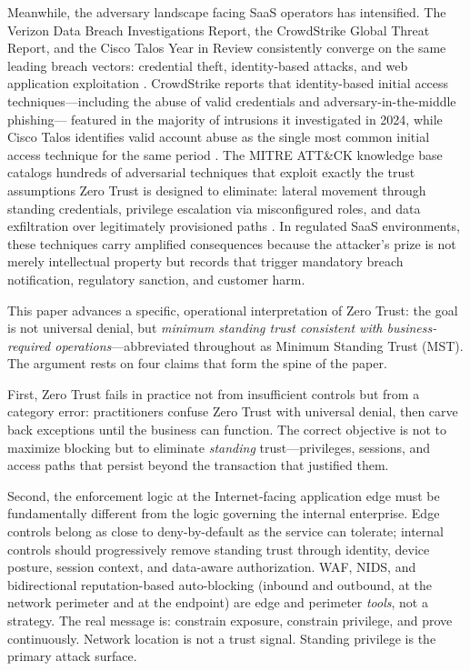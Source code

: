 \documentclass[unnumsec,webpdf,contemporary,large]{oup-authoring-template}
\theoremstyle{thmstyleone}
\theoremstyle{thmstyletwo}
\theoremstyle{thmstylethree}
\begin{document}
Meanwhile, the adversary landscape facing SaaS operators has intensified. The Verizon Data
Breach Investigations Report, the CrowdStrike Global Threat Report, and the Cisco Talos
Year in Review consistently converge on the same leading breach vectors: credential theft,
identity-based attacks, and web application exploitation \cite{verizon2025, crowdstrike2025, ciscotalos2025}. CrowdStrike reports that identity-based initial access
techniques---including the abuse of valid credentials and adversary-in-the-middle phishing---
featured in the majority of intrusions it investigated in 2024, while Cisco Talos identifies
valid account abuse as the single most common initial access technique for the same
period \cite{crowdstrike2025, ciscotalos2025}. The MITRE ATT\&CK knowledge base
catalogs hundreds of adversarial techniques that exploit exactly the trust assumptions Zero
Trust is designed to eliminate: lateral movement through standing credentials,
privilege escalation via misconfigured roles, and data exfiltration over legitimately
provisioned paths \cite{strom2018}. In regulated SaaS environments, these techniques
carry amplified consequences because the attacker's prize is not merely intellectual property
but records that trigger mandatory breach notification, regulatory sanction, and customer
harm.

This paper advances a specific, operational interpretation of Zero Trust: the goal is
not universal denial, but \textit{minimum standing trust consistent with
business-required operations}---abbreviated throughout as Minimum Standing Trust (MST).
The argument rests on four claims that form the spine of the paper.

First, Zero Trust fails in practice not from insufficient controls but from a
category error: practitioners confuse Zero Trust with universal denial, then carve
back exceptions until the business can function. The correct objective is not to
maximize blocking but to eliminate \textit{standing} trust---privileges, sessions,
and access paths that persist beyond the transaction that justified them.

Second, the enforcement logic at the Internet-facing application edge must be
fundamentally different from the logic governing the internal enterprise. Edge controls
belong as close to deny-by-default as the service can tolerate; internal controls
should progressively remove standing trust through identity, device posture, session
context, and data-aware authorization. WAF, NIDS, and bidirectional reputation-based
auto-blocking (inbound and outbound, at the network perimeter and at the endpoint) are
edge and perimeter \textit{tools}, not a strategy. The real message is: constrain exposure, constrain
privilege, and prove continuously. Network location is not a trust signal. Standing
privilege is the primary attack surface.
\end{document}
